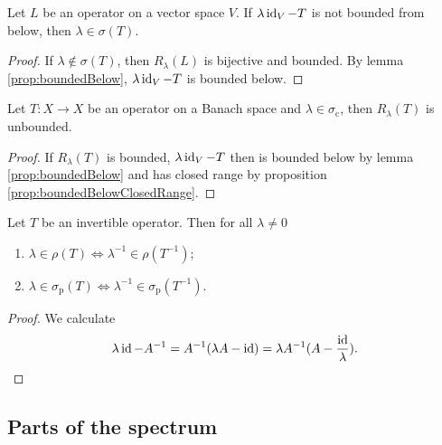 \begin{lemma}
Let $L$ be an operator on a vector space $V$. If $\lambda \operatorname{id}_V - T$ is not bounded from below, then $\lambda \in \sigma(T)$.
\end{lemma}
\begin{proof}
If $\lambda \notin \sigma(T)$, then $R_\lambda(L)$ is bijective and bounded. By lemma \ref{prop:boundedBelow}, $\lambda \operatorname{id}_V - T$ is bounded below.
\end{proof}


\begin{lemma}
Let $T:X\to X$ be an operator on a Banach space and $\lambda\in\sigma_\text{c}$, then $R_\lambda(T)$ is unbounded.
\end{lemma}
\begin{proof}
If $R_\lambda(T)$ is bounded, $\lambda \operatorname{id}_V - T$ then is bounded below by lemma \ref{prop:boundedBelow} and has closed range by proposition \ref{prop:boundedBelowClosedRange}.
\end{proof}

\begin{proposition}
Let $T$ be an invertible operator. Then for all $\lambda\neq 0$
\begin{enumerate}
\item $\lambda\in\rho(T) \iff \lambda^{-1}\in \rho(T^{-1})$;
\item $\lambda\in\sigma_\text{p}(T) \iff \lambda^{-1}\in \sigma_\text{p}(T^{-1})$.
\end{enumerate}
\end{proposition}
\begin{proof}
We calculate
\[ \lambda \operatorname{id} - A^{-1} = A^{-1}(\lambda A - \operatorname{id}) = \lambda A^{-1}(A - \frac{\operatorname{id}}{\lambda}). \]
\end{proof}

\subsection{Parts of the spectrum}
